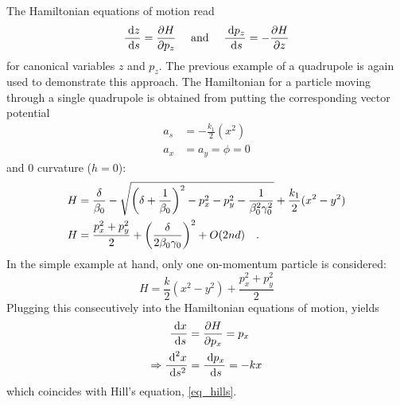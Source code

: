 The Hamiltonian equations of motion \cite{Landau1976} read
\begin{align}
    \frac{\;\text{d} z}{\;\text{d} s}=\frac{\partial H}{\partial p_z} \quad\text{ and }\quad
    \frac{\;\text{d} p_z}{\;\text{d} s}=-\frac{\partial H}{\partial z}
\end{align}
%
for canonical variables $z$ and $p_z$.
The previous example of a quadrupole is again used to demonstrate this approach.
The Hamiltonian for a particle moving through a single quadrupole is obtained from putting the
corresponding vector potential
%
\begin{align}
  a_s &= -\frac{k_1}{2}(x^2) \\
  a_x &= a_y = \phi = 0
\end{align}
%
and 0 curvature ($h = 0$):
%
\begin{align}
    H &=\frac{\delta}{\beta_0}
      - \sqrt{\left(\delta + \frac{1}{\beta_0}\right)^2 - p_x^2 - p_y^2 - \frac{1}{\beta_0^2\gamma_0^2}}
      + \frac{k_1}{2}(x^2 - y^2) \\
    H &= \frac{p_x^2 + p_y^2}{2} + \left(\frac{\delta}{2\beta_0\gamma_0}\right)^2 + O(2nd)
    \quad .
    \label{eq_hamil_quad_delta}
\end{align}
%
In the simple example at hand, only one on-momentum particle is considered:
%
\begin{equation}
    H = \frac{k}{2}\left( x^2 - y^2 \right) + \frac{p_x^2+p_y^2}{2}
    \label{eq_hamil_quad}
\end{equation}
%
Plugging this consecutively into the Hamiltonian equations of motion, yields
\begin{align}
    \frac{\;\text{d} x}{\;\text{d} s} &= \frac{\partial H}{\partial p_x} = p_x \\
    \Rightarrow \frac{\;\text{d}^2 x}{\;\text{d} s^2} &= \frac{\;\text{d} p_x}{\;\text{d} s} = -kx
\end{align}
which coincides with Hill's equation, \eqref{eq_hills}.


